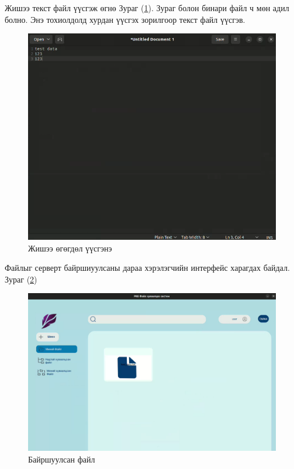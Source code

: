 Жишээ текст файл үүсгэж өгнө Зураг (\ref{fig:example_data}). Зураг болон бинари файл ч мөн адил болно. Энэ тохиолдолд хурдан үүсгэх зорилгоор текст файл үүсгэв.
\begin{figure}[H]
    \centering
    \includegraphics[scale=0.5]{Figures/example/example_data.png}
    \caption{Жишээ өгөгдөл үүсгэнэ}
    \label{fig:example_data}
\end{figure}

Файлыг серверт байршиуулсаны дараа хэрэлэгчийн интерфейс харагдах байдал. Зураг (\ref{fig:uploaded_file})
\begin{figure}[H]
    \centering
    \includegraphics[scale=0.32]{Figures/example/uploaded_file.png}
    \caption{Байршуулсан файл}
    \label{fig:uploaded_file}
\end{figure}

